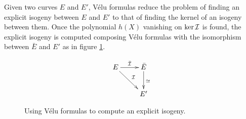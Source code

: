 Given two curves $E$ and $E'$, Vélu formulas reduce the problem of
finding an explicit isogeny between $E$ and $E'$ to that of finding
the kernel of an isogeny between them. Once the polynomial $h(X)$
vanishing on $\ker\mathcal{I}$ is found, the explicit isogeny is computed
composing Vélu formulas with the isomorphism between $\bar{E}$ and
$E'$ as in figure \ref{fig:velu}.

\begin{figure}
  \centering
  \[\xymatrix{
    E \ar[r]^{\bar{\I}} \ar[rd]^\I & \bar{E} \ar[d]^{\simeq}\\
    & E'
  }\]
  \caption{Using Vélu formulas to compute an explicit isogeny.}
  \label{fig:velu}
\end{figure}




%
